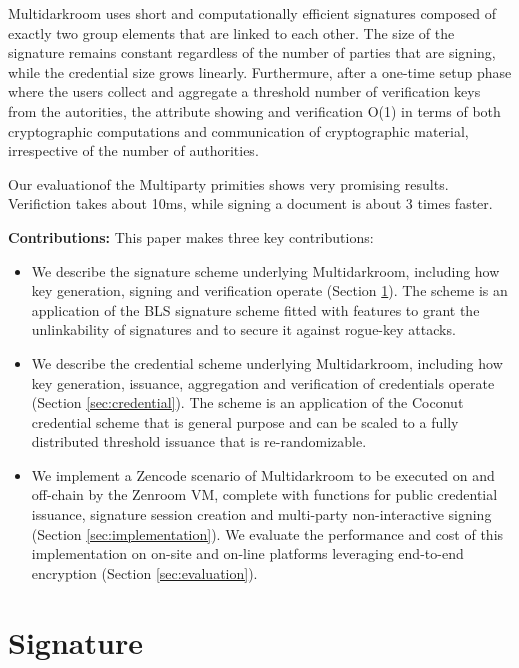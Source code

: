 \documentclass[twocolumn]{article}
\begin{document}
Multidarkroom uses short and computationally efficient signatures
composed of exactly two group elements that are linked to each
other. The size of the signature remains constant regardless of the
number of parties that are signing, while the credential size grows
linearly. Furthermure, after a one-time setup phase where the users
collect and aggregate a threshold number of verification keys from the
autorities, the attribute showing and verification O(1) in terms of
both cryptographic computations and communication of cryptographic
material, irrespective of the number of authorities.

Our evaluationof the Multiparty primities shows very promising
results. Verifiction takes about 10ms,  while signing a document is
about 3 times faster. 

\textbf{Contributions:} This paper makes three key contributions:

\begin{itemize}

\item We describe the signature scheme underlying Multidarkroom,
  including how key generation, signing and verification operate
  (Section \ref{sec:signature}). The scheme is an application of the
  BLS signature scheme \citep{asiacrypt-bls} fitted with features to
  grant the unlinkability of signatures and to secure it against
  rogue-key attacks.

\item We describe the credential scheme underlying Multidarkroom,
  including how key generation, issuance, aggregation and verification
  of credentials operate (Section \ref{sec:credential}). The scheme is
  an application of the Coconut credential scheme \citep{coconut-2018}
  that is general purpose and can be scaled to a fully distributed
  threshold issuance that is re-randomizable.

\item We implement a Zencode scenario of Multidarkroom to be executed
  on and off-chain by the Zenroom VM, complete with functions for
  public credential issuance, signature session creation and
  multi-party non-interactive signing (Section
  \ref{sec:implementation}). We evaluate the performance and cost of
  this implementation on on-site and on-line platforms leveraging
  end-to-end encryption (Section \ref{sec:evaluation}).

\end{itemize}

\section{Signature}
\label{sec:signature}
\end{document}
